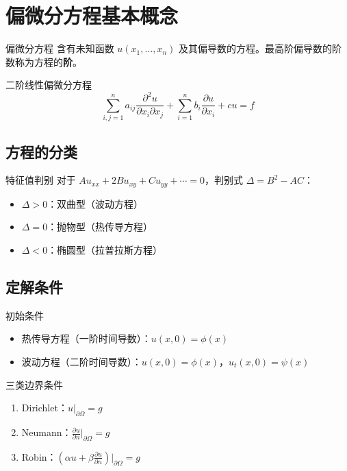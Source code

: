 ﻿\chapter{偏微分方程基本概念}

\begin{mydefinition}{偏微分方程}
含有未知函数 $u(x_1,\ldots,x_n)$ 及其偏导数的方程。最高阶偏导数的阶数称为方程的\textbf{阶}。
\end{mydefinition}

\begin{mydefinition}{二阶线性偏微分方程}
\[
\sum_{i,j=1}^{n}a_{ij}\frac{\partial^2 u}{\partial x_i\partial x_j}+\sum_{i=1}^{n}b_i\frac{\partial u}{\partial x_i}+cu=f
\]
\end{mydefinition}

\section{方程的分类}

\begin{mydefinition}{特征值判别}
对于 $Au_{xx}+2Bu_{xy}+Cu_{yy}+\cdots=0$，判别式 $\Delta=B^2-AC$：
\begin{itemize}
	\item $\Delta>0$：双曲型（波动方程）
	\item $\Delta=0$：抛物型（热传导方程）
	\item $\Delta<0$：椭圆型（拉普拉斯方程）
\end{itemize}
\end{mydefinition}

\section{定解条件}

\begin{mydefinition}{初始条件}
\begin{itemize}
	\item 热传导方程（一阶时间导数）：$u(x,0)=\phi(x)$
	\item 波动方程（二阶时间导数）：$u(x,0)=\phi(x)$，$u_t(x,0)=\psi(x)$
\end{itemize}
\end{mydefinition}

\begin{mydefinition}{三类边界条件}
\begin{enumerate}
	\item Dirichlet：$u|_{\partial\Omega}=g$
	\item Neumann：$\displaystyle\frac{\partial u}{\partial n}\bigg|_{\partial\Omega}=g$
	\item Robin：$\displaystyle\left(\alpha u+\beta\frac{\partial u}{\partial n}\right)\bigg|_{\partial\Omega}=g$
\end{enumerate}
\end{mydefinition}

